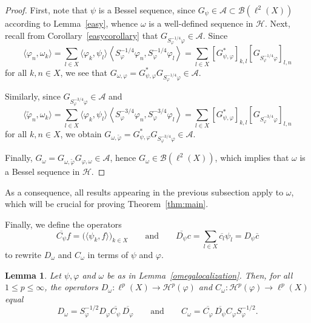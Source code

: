 \documentclass{amsart}
\newtheorem{lem.}[theorem]{Lemma}
\def\Hil{\mathcal{H}}
\newcommand{\B}[0]{{\mathcal{B}}}
\newcommand{\A}[0]{{\mathcal{A}}}
\renewcommand{\H}{{\mathcal{H}}}
\begin{document}
\begin{proof}
First, note that $\psi$ is a Bessel sequence, since $G_\psi \in \A \subset \B(\ell^2(X))$ according to Lemma~\ref{easy}, whence $\omega$ is a well-defined sequence in $\Hil$. Next, recall from Corollary~\ref{easycorollary} that $G_{S_{\varphi}^{-1/4}\varphi} \in \A$. Since 
$$\langle \varphi_n, \omega_k\rangle = \sum_{l\in X}\langle \varphi_k,\psi_l\rangle \left\langle S_{\varphi}^{-1/4}\varphi_n, S_{\varphi}^{-1/4} \varphi_l\right\rangle = \sum_{l\in X}[G_{\psi,\varphi}^*]_{k,l} \left[G_{S_{\varphi}^{-1/4}\varphi}\right]_{l,n}$$
for all $k,n\in X$, we see that $G_{\omega,\varphi} = G_{\psi,\varphi}^* G_{S_{\varphi}^{-1/4}\varphi} \in \A$.
 
Similarly, since $G_{S_\varphi^{-3/4}\varphi}\in\mathcal{A}$ and
$$\langle \widetilde{\varphi}_n, \omega_k\rangle = \sum_{l\in X}\langle \varphi_k, \psi_l\rangle \left\langle S_{\varphi}^{-3/4}\varphi_n, S_{\varphi}^{-3/4} \varphi_l\right\rangle = \sum_{l\in X}[G_{\psi,\varphi}^*]_{k,l} \left[G_{S_{\varphi}^{-3/4}\varphi}\right]_{l,n}$$
for all $k,n\in X$, we obtain $G_{\omega,\widetilde{\varphi}} = G_{\psi,\varphi}^* G_{S_{\varphi}^{-3/4}\varphi} \in \A$. 

Finally, $G_{\omega} = G_{\omega,\widetilde{\varphi}}G_{{\varphi},\omega} \in \A$, hence $G_{\omega}\in \B(\ell^2(X))$, which implies that $\omega$ is a Bessel sequence in $\Hil$.
\end{proof}

As a consequence, all results appearing in the previous subsection apply to $\omega$, which will be crucial for proving Theorem~\ref{thm:main}. 

Finally, we define the operators 
$$\overline{C_\psi}f=\big(\langle \psi_k,f\rangle\big)_{k\in X} \qquad \text{and} \qquad \overline{D_\psi} c = \sum_{l\in X} \overline{c_l} \psi_l = D_{\psi} \overline{c}$$ to rewrite $D_\omega$ and $C_\omega$ in terms of $\psi$ and $\varphi$.

\begin{lem.}\label{rewrite:D_wc}
Let $\psi,\varphi$ and $\omega$ be as in Lemma~\ref{omegalocalization}. Then, for all $1\leq p \leq \infty$, the operators $D_\omega:\ell^p(X)\to \H^p(\varphi)$ and $C_\omega: \H^p(\varphi) \to \ell^p(X)$ equal 
$$D_\omega =S_{\varphi}^{-1/2} D_{\varphi} \overline{C_{\psi}} \, \overline{D_{\varphi}} \qquad \text{and} \qquad C_\omega = \overline{C_{\varphi}} \,\overline{D_{\psi}} C_\varphi S_{\varphi}^{-1/2}.$$
\end{lem.}
\end{document}
